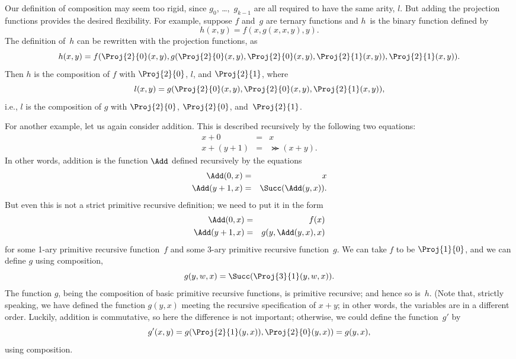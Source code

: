 \documentclass[../../../include/open-logic-section]{subfiles}
\begin{document}
Our definition of composition may seem too rigid, since
$g_0$, \dots,~$g_{k-1}$ are all required to have the same arity, $l$. But
adding the projection functions provides the desired flexibility. For
example, suppose $f$ and~$g$ are ternary functions and $h$~is the
binary function defined by
\[
h(x,y) = f(x,g(x,x,y),y).
\]
The definition of~$h$ can be rewritten with the projection
functions, as
\[
h(x,y) = f(\Proj{2}{0}(x,y), g(\Proj{2}{0}(x,y), \Proj{2}{0}(x,y),
\Proj{2}{1}(x,y)), \Proj{2}{1}(x,y)).
\]
Then $h$ is the composition of $f$ with $\Proj{2}{0}$, $l$, and
$\Proj{2}{1}$, where
\[
l(x,y) = g(\Proj{2}{0}(x,y),\Proj{2}{0}(x,y),\Proj{2}{1}(x,y)),
\]
i.e., $l$ is the composition of $g$ with $\Proj{2}{0}$, $\Proj{2}{0}$,
and~$\Proj{2}{1}$.

For another example, let us again consider addition. This is
described recursively by the following two equations:
\begin{eqnarray*}
x + 0 & = & x \\
x + (y+1) & = & \Succ(x+y).
\end{eqnarray*}
In other words, addition is the function $\Add$ defined recursively by
the equations
\begin{eqnarray*}
\Add(0,x) & = & x \\
\Add(y+1,x) & = & \Succ(\Add(y,x)).
\end{eqnarray*}
But even this is not a strict primitive recursive definition; we need
to put it in the form
\begin{eqnarray*}
\Add(0,x) & = & f(x) \\
\Add(y+1,x) & = & g(y,\Add(y,x),x)
\end{eqnarray*}
for some 1-ary primitive recursive function~$f$ and some 3-ary
primitive recursive function~$g$. We can take $f$ to be $\Proj{1}{0}$, and
we can define $g$ using composition,
\[
g(y,w,x) = \Succ(\Proj{3}{1}(y,w,x)).
\]
The function $g$, being the composition of basic primitive recursive
functions, is primitive recursive; and hence so is~$h$. (Note that,
strictly speaking, we have defined the function $g(y, x)$ meeting the
recursive specification of $x + y$; in other words, the variables are
in a different order. Luckily, addition is commutative, so here the
difference is not important; otherwise, we could define the
function~$g'$ by
\[
g'(x,y) = g(\Proj{2}{1}(y,x)),\Proj{2}{0}(y,x)) = g(y,x),
\]
using composition.
\end{document}
